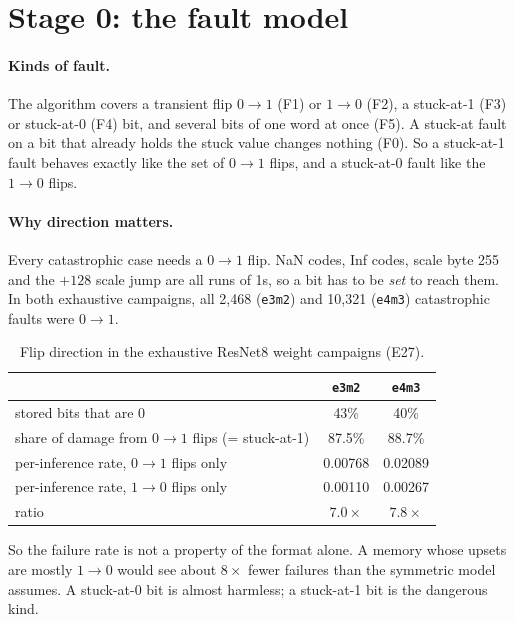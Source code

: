 \documentclass[10pt,a4paper]{article}
\newcommand{\fmt}[1]{\texttt{#1}}
\begin{document}
\section{Stage 0: the fault model}

\paragraph{Kinds of fault.} The algorithm covers a transient flip $0\to1$ (F1) or $1\to0$ (F2),
a stuck-at-1 (F3) or stuck-at-0 (F4) bit, and several bits of one word at once (F5). A stuck-at
fault on a bit that already holds the stuck value changes nothing (F0). So a stuck-at-1 fault
behaves exactly like the set of $0\to1$ flips, and a stuck-at-0 fault like the $1\to0$ flips.

\paragraph{Why direction matters.} Every catastrophic case needs a $0\to1$ flip. NaN codes, Inf
codes, scale byte 255 and the $+128$ scale jump are all runs of 1s, so a bit has to be \emph{set}
to reach them. In both exhaustive campaigns, all 2,468 (\fmt{e3m2}) and 10,321 (\fmt{e4m3})
catastrophic faults were $0\to1$.

\begin{table}[h]
\centering
\caption{Flip direction in the exhaustive ResNet8 weight campaigns (E27).}
\begin{tabular}{lcc}
\toprule
 & \fmt{e3m2} & \fmt{e4m3} \\
\midrule
stored bits that are 0 & 43\% & 40\% \\
share of damage from $0\to1$ flips (= stuck-at-1) & 87.5\% & 88.7\% \\
per-inference rate, $0\to1$ flips only & 0.00768 & 0.02089 \\
per-inference rate, $1\to0$ flips only & 0.00110 & 0.00267 \\
ratio & $7.0\times$ & $7.8\times$ \\
\bottomrule
\end{tabular}
\end{table}

So the failure rate is not a property of the format alone. A memory whose upsets are mostly
$1\to0$ would see about $8\times$ fewer failures than the symmetric model assumes. A stuck-at-0
bit is almost harmless; a stuck-at-1 bit is the dangerous kind.
\end{document}
